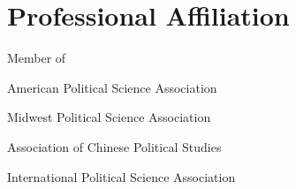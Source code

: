\documentclass[
  12pt,
]
{article}
\providecommand{\tightlist}{%
  \setlength{\itemsep}{0pt}\setlength{\parskip}{0pt}}
\renewenvironment{itemize}{
  \begin{list}{}{
    \setlength{\leftmargin}{1.5em}
  }
}{
  \end{list}
}
\begin{document}
\hypertarget{professional-affiliation}{%
\section{Professional Affiliation}\label{professional-affiliation}}

Member of

\begin{itemize}
\tightlist
\item
  American Political Science Association
\item
  Midwest Political Science Association
\item
  Association of Chinese Political Studies
\item
  International Political Science Association
\end{itemize}
\end{document}
